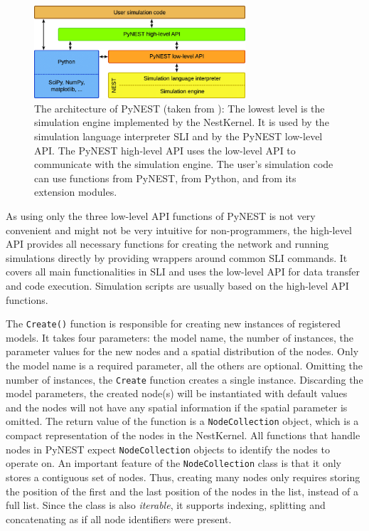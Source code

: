 \begin{figure}[ht!]
\centering
\includegraphics[width=0.7\textwidth]{src/pic/The-architecture-of-PyNEST-The-lowest-level-is-the-simulation-engine-It-is-used-by.png}
\caption{The architecture of PyNEST (taken from \citep{epp}): The lowest level is the simulation engine implemented by the NestKernel. It is used by the simulation language interpreter SLI and by the PyNEST low-level API. The PyNEST high-level API uses the low-level API to communicate with the simulation engine. The user’s simulation code can use functions from PyNEST, from Python, and from its extension modules.}
\label{fig:pynest}
\end{figure}

As using only the three low-level API functions of PyNEST is not very convenient and might not be very intuitive for non-programmers, the high-level API provides all necessary functions for creating the network and running simulations directly by providing wrappers around common SLI commands. It covers all main functionalities in SLI and uses the low-level API for data transfer and code execution. Simulation scripts are usually based on the high-level API functions.

The \texttt{Create()} function is responsible for creating new instances of registered models. It takes four parameters: the model name, the number of instances, the parameter values for the new nodes and a spatial distribution of the nodes. Only the model name is a required parameter, all the others are optional. Omitting the number of instances, the \texttt{Create} function creates a single instance. Discarding the model parameters, the created node(s) will be instantiated with default values and the nodes will not have any spatial information if the spatial parameter is omitted. The return value of the function is a \texttt{NodeCollection} object, which is a compact representation of the nodes in the NestKernel. All functions that handle nodes in PyNEST expect \texttt{NodeCollection} objects to identify the nodes to operate on. An important feature of the \texttt{NodeCollection} class is that it only stores a contiguous set of nodes. Thus, creating many nodes only requires storing the position of the first and the last position of the nodes in the list, instead of a full list. Since the class is also \emph{iterable}, it supports indexing, splitting and concatenating as if all node identifiers were present.


